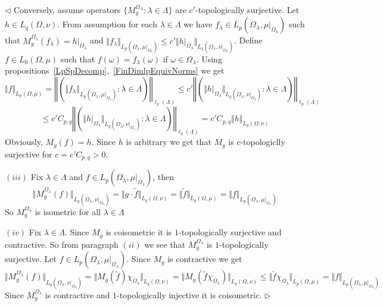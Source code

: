 \documentclass[12pt]{article}
\newenvironment{proof}{\par $\triangleleft$}{$\triangleright$}
\begin{document}
\begin{proof}
    Conversely, assume operators $ \{M_g^{\Omega_\Lambda}:\lambda\in\Lambda \}$
    are $c'$-topologically surjective. Let $h\in L_q(\Omega,\nu)$. From
    assumption for each $\lambda\in\Lambda$ we have $f_\lambda\in
        L_p(\Omega_\lambda,\mu|_{\Omega_\lambda})$ such that
    $M_g^{\Omega_\lambda}(f_\lambda)=h|_{\Omega_\lambda}$ and $\Vert
        f_\lambda\Vert_{L_p(\Omega_\lambda,\mu|_{\Omega_\lambda})}\leq c'\Vert
        h|_{\Omega_\lambda}\Vert_{L_q(\Omega_\lambda,\nu|_{\Omega_\lambda})}$.
    Define $f\in L_0(\Omega,\mu)$ such that $f(\omega)=f_\lambda(\omega)$ if
    $\omega\in\Omega_\lambda$.  Using
    propositions~\ref{LpSpDecomp},~\ref{FinDimlpEquivNorms} we get
    $$
        \Vert f\Vert_{L_p(\Omega,\mu)}
        =\left\Vert
        \left(
        \Vert f_\lambda\Vert_{
        L_p(\Omega_\lambda,\mu|_{\Omega_\lambda})
        }:\lambda\in\Lambda
        \right)\right\Vert_{\ell_p(\Lambda)}
        \leq c'\left\Vert\left(\Vert h|_{\Omega_\lambda}\Vert_{
        L_q(\Omega_\lambda,\nu|_{\Omega_\lambda})}
        :\lambda\in\Lambda\right)\right\Vert_{\ell_p(\Lambda)}
    $$
    $$
        \leq c'C_{p,q}\left\Vert\left(
        \Vert h|_{\Omega_\lambda}\Vert_{
        L_q(\Omega_\lambda,\nu|_{\Omega_\lambda})
        }:\lambda\in\Lambda
        \right)\right\Vert_{\ell_q(\Lambda)}
        =c'C_{p,q}\Vert h\Vert_{L_q(\Omega,\nu)}
    $$
    Obviously, $M_g(f)=h$. Since $h$ is arbitrary we get that $M_g$ is
    $c$-topologiclly surjective for $c=c'C_{p,q}>0$.

    $(iii)$ Fix $\lambda\in\Lambda$ and $f\in
        L_p(\Omega_\lambda,\mu|_{\Omega_\lambda})$, then
    $$
        \Vert M_g^{\Omega_\lambda}(f)\Vert_{
        L_q(\Omega_\lambda,\nu|_{\Omega_\lambda})}
        =\Vert g\cdot \widetilde{f}\Vert_{L_q(\Omega,\nu)}
        =\Vert\widetilde{f}\Vert_{L_p(\Omega,\mu)}
        =\Vert f\Vert_{L_p(\Omega_\lambda,\mu|_{\Omega_\lambda})}
    $$
    So $M_g^{\Omega_\lambda}$ is isometric for all $\lambda\in\Lambda$

    $(iv)$ Fix $\lambda\in\Lambda$. Since $M_g$ is coisometric it is
    $1$-topologically surjective and contractive. So from paragraph $(ii)$ we
    see that $M_g^{\Omega_\lambda}$ is $1$-topologically surjective. Let $f\in
        L_p(\Omega_\lambda,\mu|_{\Omega_\lambda})$. Since $M_g$ is contractive we
    get
    $$
        \Vert M_g^{\Omega_\lambda}(f)\Vert_{
        L_q(\Omega_\lambda,\nu|_{\Omega_\lambda})}
        =\Vert M_g(\widetilde{f})\chi_{\Omega_\lambda}\Vert_{L_q(\Omega,\nu)}
        =\Vert M_g(\widetilde{f}\chi_{\Omega_\lambda})\Vert_{L_q(\Omega,\nu)}
        \leq \Vert\widetilde{f}\chi_{\Omega_\lambda}\Vert_{L_p(\Omega,\mu)}
        =\Vert f\Vert_{L_p(\Omega_{\lambda},\mu|_{\Omega_\lambda})}
    $$
    Since $M_g^{\Omega_\lambda}$ is contractive and $1$-topologically injective
    it is coisometric.
\end{proof}
\end{document}
